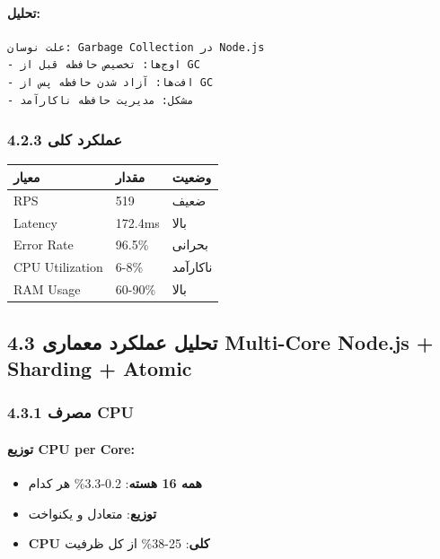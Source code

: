 \documentclass[
]{article}
\newcounter{none} %
\providecommand{\tightlist}{%
  \setlength{\itemsep}{0pt}\setlength{\parskip}{0pt}}
\begin{document}
\paragraph{تحلیل:}\label{ux62aux62dux644ux6ccux644-1}

\begin{verbatim}
علت نوسان: Garbage Collection در Node.js
- اوج‌ها: تخصیص حافظه قبل از GC
- افت‌ها: آزاد شدن حافظه پس از GC
- مشکل: مدیریت حافظه ناکارآمد
\end{verbatim}

\subsubsection{4.2.3 عملکرد
کلی}\label{ux639ux645ux644ux6a9ux631ux62f-ux6a9ux644ux6cc}

{\def\LTcaptype{none} %
\begin{longtable}[]{@{}lll@{}}
\toprule\noalign{}
معیار & مقدار & وضعیت \\
\midrule\noalign{}
\endhead
\bottomrule\noalign{}
\endlastfoot
RPS & 519 & ضعیف \\
Latency & 172.4ms & بالا \\
Error Rate & 96.5\% & بحرانی \\
CPU Utilization & 6-8\% & ناکارآمد \\
RAM Usage & 60-90\% & بالا \\
\end{longtable}
}

\subsection{4.3 تحلیل عملکرد معماری Multi-Core Node.js + Sharding +
Atomic}\label{ux62aux62dux644ux6ccux644-ux639ux645ux644ux6a9ux631ux62f-ux645ux639ux645ux627ux631ux6cc-multi-core-node.js-sharding-atomic}

\subsubsection{4.3.1 مصرف CPU}\label{ux645ux635ux631ux641-cpu-1}

\paragraph{توزیع CPU per
Core:}\label{ux62aux648ux632ux6ccux639-cpu-per-core-1}

\begin{itemize}
\tightlist
\item
  \textbf{همه 16 هسته}: 0.2-3.3\% هر کدام
\item
  \textbf{توزیع}: متعادل و یکنواخت
\item
  \textbf{CPU کلی}: 25-38\% از کل ظرفیت
\end{itemize}
\end{document}
